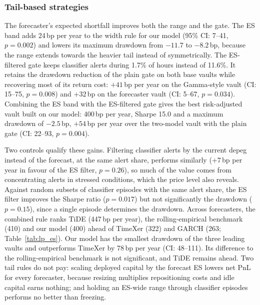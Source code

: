 \subsubsection{Tail-based strategies}

The forecaster's expected shortfall improves both the range and the gate. The ES band adds
24\,bp per year to the width rule for our model (95\% CI: 7--41, $p=0.002$) and lowers its
maximum drawdown from $-11.7$ to $-8.2$\,bp, because the range extends towards the heavier
tail instead of symmetrically. The ES-filtered gate keeps classifier alerts during 1.7\% of
hours instead of 11.6\%. It retains the drawdown reduction of the plain gate on both base vaults
while recovering most of its return cost: $+41$\,bp per year on the Gamma-style vault (CI:
15--75, $p=0.008$) and $+32$\,bp on the forecaster vault (CI: 5--67, $p=0.034$). Combining the
ES band with the ES-filtered gate gives the best risk-adjusted vault built on our model: 400\,bp
per year, Sharpe 15.0 and a maximum drawdown of $-2.5$\,bp, $+54$\,bp per year over the
two-model vault with the plain gate (CI: 22--93, $p=0.004$).

Two controls qualify these gains. Filtering classifier alerts by the current depeg instead of
the forecast, at the same alert share, performs similarly ($+7$\,bp per year in favour of the ES
filter, $p=0.26$), so much of the value comes from concentrating alerts in stressed conditions,
which the price level also reveals. Against random subsets of classifier episodes with the same
alert share, the ES filter improves the Sharpe ratio ($p=0.017$) but not significantly the
drawdown ($p=0.15$), since a single episode determines the drawdown. Across forecasters, the
combined rule ranks TiDE (447\,bp per year), the rolling-empirical benchmark (410) and our model
(400) ahead of TimeXer (322) and GARCH (263; Table~\ref{tab:lp_es}). Our model has the smallest
drawdown of the three leading vaults and outperforms TimeXer by 78\,bp per year (CI: 48--111).
Its difference to the rolling-empirical benchmark is not significant, and TiDE remains ahead.
Two tail rules do not pay: scaling deployed capital by the forecast ES lowers net PnL for every
forecaster, because resizing multiplies repositioning costs and idle capital earns nothing; and
holding an ES-wide range through classifier episodes performs no better than freezing.

